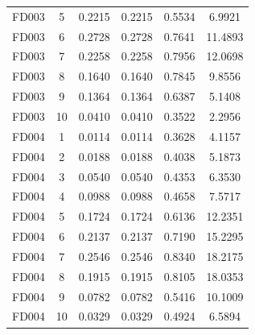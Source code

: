 \begin{table}[t]
\begin{tabular}{lccccc}
FD003 & 5 & 0.2215 & 0.2215 & 0.5534 & 6.9921 \\
FD003 & 6 & 0.2728 & 0.2728 & 0.7641 & 11.4893 \\
FD003 & 7 & 0.2258 & 0.2258 & 0.7956 & 12.0698 \\
FD003 & 8 & 0.1640 & 0.1640 & 0.7845 & 9.8556 \\
FD003 & 9 & 0.1364 & 0.1364 & 0.6387 & 5.1408 \\
FD003 & 10 & 0.0410 & 0.0410 & 0.3522 & 2.2956 \\
FD004 & 1 & 0.0114 & 0.0114 & 0.3628 & 4.1157 \\
FD004 & 2 & 0.0188 & 0.0188 & 0.4038 & 5.1873 \\
FD004 & 3 & 0.0540 & 0.0540 & 0.4353 & 6.3530 \\
FD004 & 4 & 0.0988 & 0.0988 & 0.4658 & 7.5717 \\
FD004 & 5 & 0.1724 & 0.1724 & 0.6136 & 12.2351 \\
FD004 & 6 & 0.2137 & 0.2137 & 0.7190 & 15.2295 \\
FD004 & 7 & 0.2546 & 0.2546 & 0.8340 & 18.2175 \\
FD004 & 8 & 0.1915 & 0.1915 & 0.8105 & 18.0353 \\
FD004 & 9 & 0.0782 & 0.0782 & 0.5416 & 10.1009 \\
FD004 & 10 & 0.0329 & 0.0329 & 0.4924 & 6.5894 \\
\bottomrule
\end{tabular}
\end{table}
